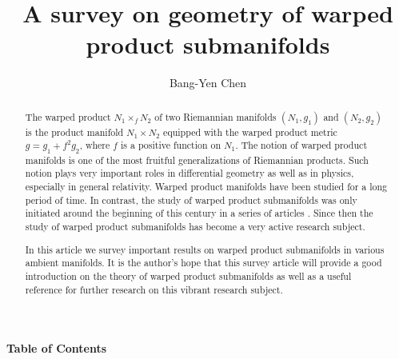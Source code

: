 \documentclass{amsart}
\title[Warped product submanifolds]
{A survey on geometry of warped product submanifolds}
\author{ Bang-Yen Chen}
\theoremstyle{plain}
\numberwithin{equation}{section}
\theoremstyle{remark}
\numberwithin{equation}{section}
\begin{document}
\begin{abstract} 
The warped product $N_1\times_f N_2$ of two Riemannian manifolds $(N_1,g_1)$ and $(N_2,g_2)$ is the product manifold $N_1\times N_2$ equipped with the warped product metric
$g=g_1+f^2 g_2$, where $f$ is a positive function on $N_1$. 
The notion of warped product manifolds is one of the most fruitful generalizations of Riemannian products. Such notion plays very important roles in differential geometry as well as in
physics, especially in general relativity. 
Warped product manifolds have been studied for a long period of time. In contrast, the study of warped product submanifolds was only initiated around the beginning of this century   in a series of articles \cite{c5.1,c7,c8,c02-2}.  Since then the study of  warped product submanifolds has become a very active research subject.

 In this article we survey important results on warped product submanifolds in various ambient manifolds.   It is the author's hope that this survey article will provide a good introduction on the theory of warped product submanifolds as well as a useful reference for further research on this vibrant research subject.

\end{abstract}

\maketitle
\pagestyle{myheadings}

\setcounter{equation}{0}

{\bf Table of Contents}
\end{document}
